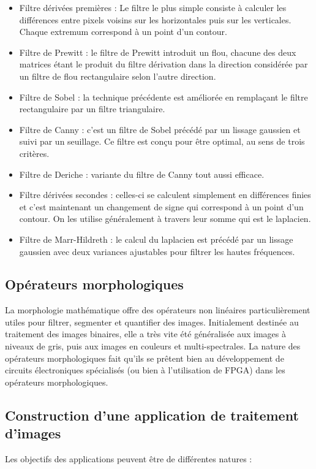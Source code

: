 \documentclass[11pt]{report}
\begin{document}
\begin{itemize}
		\item 
	Filtre dérivées premières : Le filtre le plus simple consiste à calculer les différences
	entre pixels voisins sur les horizontales puis sur les verticales. Chaque extremum
	correspond à un point d'un contour.
		\item 
	Filtre de Prewitt : le filtre de Prewitt introduit un flou, chacune des deux matrices
	étant le produit du filtre dérivation dans la direction considérée par un filtre de flou
	rectangulaire selon l'autre direction.
		\item 
	Filtre de Sobel : la technique précédente est améliorée en remplaçant le filtre
	rectangulaire par un filtre triangulaire.
	\item 
	Filtre de Canny : c'est un filtre de Sobel précédé par un lissage gaussien et suivi par
	un seuillage. Ce filtre est conçu pour être optimal, au sens de trois critères.
		\item Filtre de Deriche : variante du filtre de Canny tout aussi efficace.
		\item  Filtre dérivées secondes : celles-ci se calculent simplement en différences finies et
	c'est maintenant un changement de signe qui correspond à un point d'un contour.
	On les utilise généralement à travers leur somme qui est le laplacien.
	\item 
	Filtre de Marr-Hildreth : le calcul du laplacien est précédé par un lissage gaussien
	avec deux variances ajustables pour filtrer les hautes fréquences.
	
\end{itemize}

\subsection{Opérateurs morphologiques}
La morphologie mathématique offre des opérateurs non linéaires particulièrement
utiles pour filtrer, segmenter et quantifier des images. Initialement destinée au traitement
des images binaires, elle a très vite été généralisée aux images à niveaux de gris, puis aux
images en couleurs et multi-spectrales.
La nature des opérateurs morphologiques fait qu'ils se prêtent bien au
développement de circuits électroniques spécialisés (ou bien à l'utilisation de FPGA) dans les
opérateurs morphologiques.
\subsection{Construction d’une application de traitement d’images}
Les objectifs des applications peuvent être de différentes natures :
\end{document}
